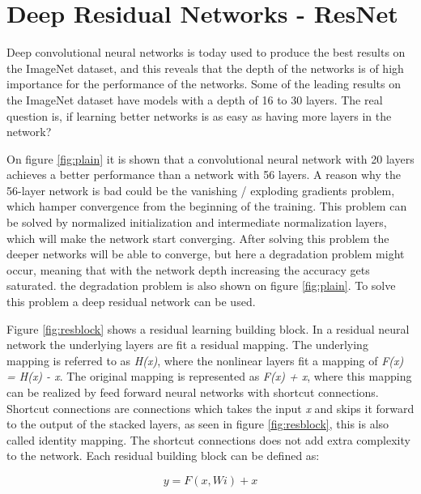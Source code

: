 \section{Deep Residual Networks - ResNet}
Deep convolutional neural networks is today used to produce the best results on the ImageNet dataset, and this reveals that the depth of the networks is of high importance for the performance of the networks\citep{RESNET}. Some of the leading results on the ImageNet dataset have models with a depth of 16 to 30 layers. The real question is, if learning better networks is as easy as having more layers in the network?


On figure \ref{fig:plain} it is shown that a convolutional neural network with 20 layers achieves a better performance than a network with 56 layers. A reason why the 56-layer network is bad could be the vanishing / exploding gradients problem, which hamper convergence from the beginning of the training. This problem can be solved by normalized initialization and intermediate normalization layers, which will make the network start converging. After solving this problem the deeper networks will be able to converge, but here a degradation problem might occur, meaning that with the network depth increasing the accuracy gets saturated. the degradation problem is also shown on figure \ref{fig:plain}. To solve this problem a deep residual network can be used.


Figure \ref{fig:resblock} shows a residual learning building block. In a residual neural network the underlying layers are fit a residual mapping. The underlying mapping is referred to as \emph{H(x)}, where the nonlinear layers fit a mapping of \emph{F(x) = H(x) - x}. The original mapping is represented as \emph{F(x) + x}, where this mapping can be realized by feed forward neural networks with shortcut connections. Shortcut connections are connections which takes the input \emph{x} and skips it forward to the output of the stacked layers, as seen in figure \ref{fig:resblock}, this is also called identity mapping. The shortcut connections does not add extra complexity to the network. Each residual building block can be defined as:

\begin{equation} \label{eq:res}
y = F(x, {Wi}) + x
\end{equation} 

